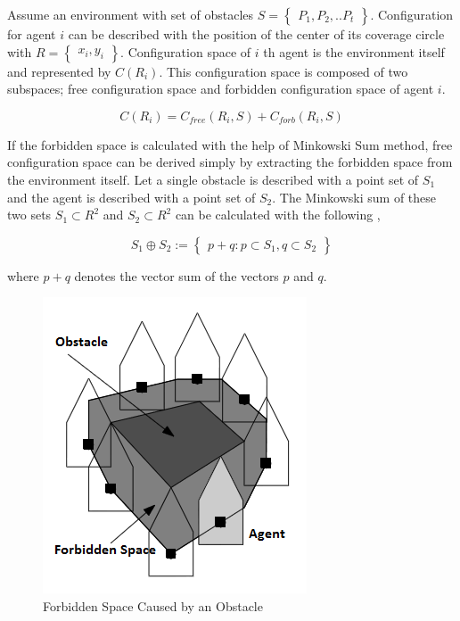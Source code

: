 Assume an environment with set of obstacles $S = \begin{Bmatrix}
P_1, P_2, .. P_t \end{Bmatrix}$. Configuration for agent $i$ can be described with the position of the center of its coverage circle with $R=\begin{Bmatrix}x_i, y_i\end{Bmatrix}$. Configuration space of $i$ th agent is the environment itself and represented by $C(R_i)$. This configuration space is composed of two subspaces; free configuration space and forbidden configuration space of agent $i$.

\begin{equation}
C(R_i) = C_{free}(R_i,S) + C_{forb}(R_i,S)
\end{equation}

If the forbidden space is calculated with the help of Minkowski Sum method, free configuration space can be derived simply by extracting the forbidden space from the environment itself. Let a single obstacle is described with a point set of $S_1$ and the agent is described with a point set of $S_2$. The Minkowski sum of these two sets $S_1 \subset R^2$ and $S_2 \subset R^2$ can be calculated with the following \cite{92},
	
\begin{equation}
S_1 \oplus S_2 := \begin{Bmatrix}
p+q : p \subset S_1, q \subset S_2
\end{Bmatrix} 
\end{equation}

where $p+q$ denotes the vector sum of the vectors $p$ and $q$.
		
\begin{figure}[H]
\caption{Forbidden Space Caused by an Obstacle \cite{92}} \label{yasakli_bolge}
\centering
\includegraphics[scale = 0.75]{Forbidden}
\end{figure}
	
